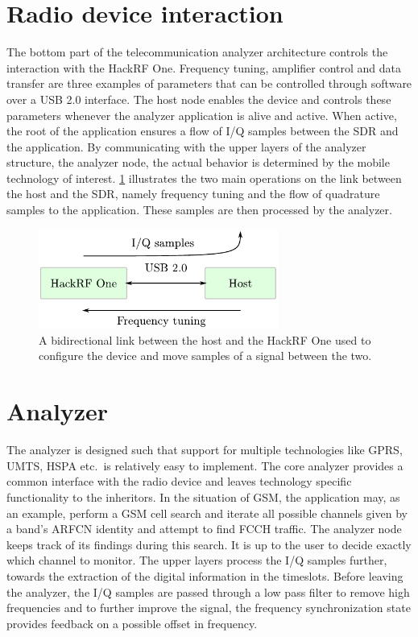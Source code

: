 \section{Radio device interaction}
The bottom part of the telecommunication analyzer architecture
controls the interaction with the HackRF One. Frequency tuning,
amplifier control and data transfer are three examples of parameters
that can be controlled through software over a \gls{USB} 2.0
interface. The host node enables the device and controls these
parameters whenever the analyzer application is alive and active. When
active, the root of the application ensures a flow of \gls{I}/\gls{Q}
samples between the \gls{SDR} and the application. By communicating
with the upper layers of the analyzer structure, the analyzer node,
the actual behavior is determined by the mobile technology of
interest. \cref{fig:device_host_usb_interface} illustrates the two
main operations on the link between the host and the \gls{SDR}, namely
frequency tuning and the flow of quadrature samples to the
application. These samples are then processed by the analyzer.

\begin{figure}[H]
  \centering
  \includegraphics[width=0.7\textwidth]{figures/device_host_usb_interface}
  \caption{A bidirectional link between the host and the HackRF One
    used to configure the device and move samples of a signal between
    the two.}
  \label{fig:device_host_usb_interface}
\end{figure}

\section{Analyzer}
The analyzer is designed such that support for multiple technologies
like \gls{GPRS}, \gls{UMTS}, \gls{HSPA} etc.\ is relatively easy to
implement. The core analyzer provides a common interface with the
radio device and leaves technology specific functionality
to the inheritors. In the situation of \gls{GSM}, the application may,
as an example, perform a \gls{GSM} cell search and iterate all
possible channels given by a band's \gls{ARFCN} identity and attempt
to find \gls{FCCH} traffic. The analyzer node keeps track of its
findings during this search. It is up to the user to decide exactly
which channel to monitor. The upper layers process the \gls{I}/\gls{Q}
samples further, towards the extraction of the digital information in
the timeslots. Before leaving the analyzer, the \gls{I}/\gls{Q}
samples are passed through a low pass filter to remove high
frequencies and to further improve the signal, the frequency
synchronization state provides feedback on a possible offset in
frequency.

